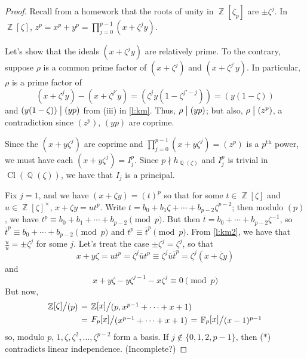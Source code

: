 \documentclass[11pt, a4paper]{memoir}
\DeclareMathOperator{\Q}{{\mathbb{Q}}}
\DeclareMathOperator{\Z}{{\mathbb{Z}}}
\DeclareMathOperator{\F}{{\mathbb{F}}}
\renewcommand{\div}{\bigm|}
\newcommand{\ol}[1]{\ensuremath{\overline{#1}}}
\theoremstyle{change}
\theoremstyle{plain}
\theoremstyle{nonumberplain}
\newtheorem{proof}{Proof}
\newcommand{\quot}[2]{\mathchoice{\left.\raisebox{0.07em}{$#1$}\middle/\raisebox{-0.07em}{$#2$}\right.}
                                 {\left.\raisebox{0.03em}{$#1$}\middle/\raisebox{-0.03em}{$#2$}\right.}
                                 {\left.\raisebox{0.00em}{$#1$}\middle/\raisebox{-0.00em}{$#2$}\right.}
                                 {\left.\raisebox{0em}{$#1$}\middle/\raisebox{0em}{$#2$}\right.}}
\DeclareMathOperator{\Cl}{Cl}
\numberwithin{equation}{section}
\begin{document}
\begin{proof}
    Recall from a homework that the roots of unity in $\Z[\zeta_p]$ are $\pm\zeta^j$.
    In $\Z[\zeta]$, $z^p=x^p+y^p=\prod_{j=0}^{p-1}(x+\zeta^jy)$.

    Let's show that the ideals $(x+\zeta^jy)$ are relatively prime.
    To the contrary, suppose $\rho$ is a common prime factor of $(x+\zeta^j)$ and $(x+\zeta^{j'}y)$.
    In particular, $\rho$ is a prime factor of
    \begin{equation*}
        (x+\zeta^jy)-(x+\zeta^{j'}y)=\left(\zeta^jy(1-\zeta^{j'-j})\right)=(y(1-\zeta))
    \end{equation*}
    and $(y(1-\zeta))\div(yp)$ from (iii) in \cref{l:km}.
    Thus, $\rho\div(yp)$; but also, $\rho\div(z^p)$, a contradiction since $(z^p)$, $(yp)$ are coprime.

    Since the $(x+y\zeta^j)$ are coprime and $\prod_{j=0}^{p-1}(x+y\zeta^j)=(z^p)$ is a $p^\text{th}$ power, we must have each $(x+y\zeta^j)=I_j^p$.
    Since $p\nmid h_{\Q(\zeta)}$ and $I_j^p$ is trivial in $\Cl(\Q(\zeta))$, we have that $I_j$ is a principal.

    Fix $j=1$, and we have $(x+\zeta y)=(t)^p$ so that for some $t\in\Z[\zeta]$ and $u\in\Z[\zeta]^\times$, $x+\zeta y=ut^p$.
    Write $t=b_0+b_1\zeta+\cdots+b_{p-2}\zeta^{p-2}$; then modulo $(p)$, we have $t^p\equiv b_0+b_1+\cdots+b_{p-2}\pmod{p}$.
    But then $\ol{t}=b_0+\cdots+b_{p-2}\zeta^{-1}$, so $\ol{t}^p\equiv b_0+\cdots+b_{p-2}\pmod{p}$ and $t^p\equiv \ol{t}^p\pmod{p}$.
    From \cref{l:km2}, we have that $\frac{u}{\ol{u}}=\pm\zeta^j$ for some $j$.
    Let's treat the case $\pm\zeta^j=\zeta^j$, so that
    \begin{equation*}
        x+y\zeta=ut^p=\zeta^j\ol{u}t^p\equiv\zeta^j\ol{u}\ol{t}^p=\zeta^j(x+\ol{\zeta}y)
    \end{equation*}
    and
    \begin{equation}
        x+y\zeta-y\zeta^{j-1}-x\zeta^j\equiv 0\pmod{p}\label{e:km}
    \end{equation}
    But now,
    \begin{align*}
        \quot{\Z[\zeta]}{(p)} &= \quot{\Z[x]}{(p,x^{p-1}+\cdots+x+1)}\\
                              &= \quot{F_p[x]}{(x^{p-1}+\cdots+x+1)}=\quot{\F_p[x]}{(x-1)^{p-1}}
    \end{align*}
    so, modulo $p$, $1,\zeta,\zeta^2,\ldots,\zeta^{p-2}$ form a basis.
    If $j\notin\{0,1,2,p-1\}$, then ($*$) contradicts linear independence.
    (Incomplete?)
\end{proof}
\end{document}
